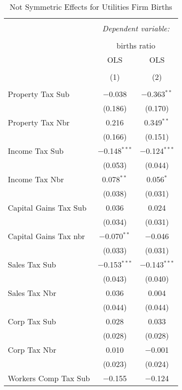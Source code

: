 
\begin{table}[!htbp] \centering 
  \caption{Not Symmetric Effects for  Utilities Firm Births} 
  \label{22noequality} 
\footnotesize 
\begin{tabular}{@{\extracolsep{5pt}}lcc} 
\\[-1.8ex]\hline 
\hline \\[-1.8ex] 
 & \multicolumn{2}{c}{\textit{Dependent variable:}} \\ 
\cline{2-3} 
\\[-1.8ex] & \multicolumn{2}{c}{births ratio} \\ 
 & OLS & OLS \\ 
\\[-1.8ex] & (1) & (2)\\ 
\hline \\[-1.8ex] 
 Property Tax Sub & $-$0.038 & $-$0.363$^{**}$ \\ 
  & (0.186) & (0.170) \\ 
  Property Tax Nbr & 0.216 & 0.349$^{**}$ \\ 
  & (0.166) & (0.151) \\ 
  Income Tax Sub & $-$0.148$^{***}$ & $-$0.124$^{***}$ \\ 
  & (0.053) & (0.044) \\ 
  Income Tax Nbr & 0.078$^{**}$ & 0.056$^{*}$ \\ 
  & (0.038) & (0.031) \\ 
  Capital Gains Tax Sub & 0.036 & 0.024 \\ 
  & (0.034) & (0.031) \\ 
  Capital Gains Tax nbr & $-$0.070$^{**}$ & $-$0.046 \\ 
  & (0.033) & (0.031) \\ 
  Sales Tax Sub & $-$0.153$^{***}$ & $-$0.143$^{***}$ \\ 
  & (0.043) & (0.040) \\ 
  Sales Tax Nbr & 0.036 & 0.004 \\ 
  & (0.044) & (0.044) \\ 
  Corp Tax Sub & 0.028 & 0.033 \\ 
  & (0.028) & (0.028) \\ 
  Corp Tax Nbr & 0.010 & $-$0.001 \\ 
  & (0.023) & (0.024) \\ 
  Workers Comp Tax Sub & $-$0.155 & $-$0.124 \\ 

\end{tabular}
\end{table}
